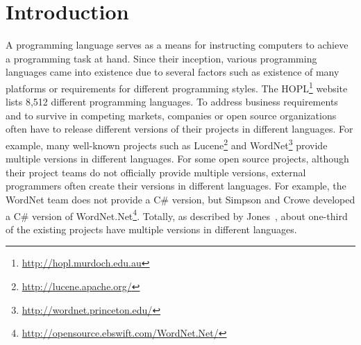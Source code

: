 \section{Introduction}
\label{sec:introduction}

A programming language serves as a means for instructing computers
to achieve a programming task at hand. Since their inception,
various programming languages came into existence due to several
factors such as existence of many platforms or requirements for
different programming styles. The
HOPL\footnote{\url{http://hopl.murdoch.edu.au}} website lists 8,512
different programming languages. To address business requirements
and to survive in competing markets, companies or open source
organizations often have to release different versions of their
projects in different languages. For example, many well-known
projects such as
Lucene\footnote{\url{http://lucene.apache.org/}}
and WordNet\footnote{\url{http://wordnet.princeton.edu/}} provide
multiple versions in different languages. For some open source
projects, although their project teams do not officially provide
multiple versions, external programmers often create their versions
in different languages. For example, the WordNet team does not
provide a C\# version, but Simpson and Crowe developed a C\# version
of
WordNet.Net\footnote{\url{http://opensource.ebswift.com/WordNet.Net/}}.
Totally, as described by Jones~\cite{jones1998estimating}, about
one-third of the existing projects have multiple versions in
different languages.


